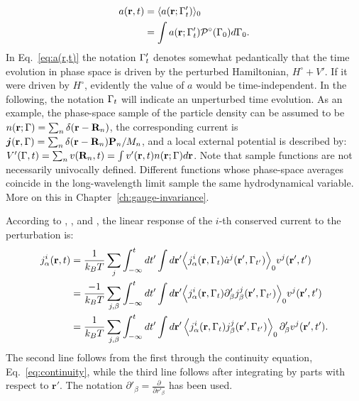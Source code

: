 \begin{equation}
  \begin{aligned}
    a(\mathbf{r},t) &= \langle a(\mathbf{r};\rGamma'_t)\rangle_0 \\
    &= \int a(\mathbf{r};\rGamma'_t) \mathcal{P}^\circ(\rGamma_0) d\rGamma_0.
  \end{aligned} \label{eq:a(r,t)}
\end{equation}
In Eq.~\eqref{eq:a(r,t)} the notation ${\mathrm\Gamma}'_t$ denotes somewhat pedantically that the time evolution in phase space is driven by the perturbed Hamiltonian, $H^\circ+V'$. If it were driven by $H^\circ$, evidently the value of $a$ would be time-independent. In the following, the notation ${\mathrm\Gamma}_t$ will indicate an unperturbed time evolution. As an example, the phase-space sample of the particle density can be assumed to be $n(\mathbf{r};{\mathrm\Gamma}) = \sum_n \delta (\mathbf{r}-\mathbf{R}_n)$, the corresponding current is $\bm{j} (\mathbf{r}, {\mathrm\Gamma}) = \sum_n \delta(\mathbf{r}-\mathbf{R}_n) \mathbf{P}_n / M_n $, and a local external potential is described by: $V'({\mathrm\Gamma},t)=\sum_n v(\mathbf{R}_n,t)=\int v'(\mathbf{r},t) n(\mathbf{r};{\mathrm\Gamma}) d \mathbf{r}$. Note that sample functions are not necessarily univocally defined. Different functions whose phase-space averages coincide in the long-wavelength limit sample the same hydrodynamical variable. More on this in Chapter~\ref{ch:gauge-invariance}.

According to \cite{Green1954}, \cite{Kubo1957a}, and \cite{Kubo1957b}, the linear response of the $i$-th conserved current to the perturbation is:
\begin{align}
  j_\alpha^i(\mathbf{r},t) & = \frac{1}{k_B T} \sum_j \int_{-\infty}^t dt' \int d\mathbf{r}' \Bigl \langle j_\alpha^i(\mathbf{r},\rGamma_t)\dot a^j(\mathbf{r}',\rGamma_{t'})\Bigr \rangle_0 v^j(\mathbf{r}',t') \\
  &= \frac{-1}{k_B T} \sum_{j,\beta} \int_{-\infty}^t dt' \int d\mathbf{r}' \Bigl \langle j_\alpha^i(\mathbf{r},\rGamma_t) \partial'_\beta j_\beta^j(\mathbf{r}',\rGamma_{t'})\Bigr \rangle_0 v^j(\mathbf{r}',t') \\
  &= \frac{1}{k_B T} \sum_{j,\beta} \int_{-\infty}^t dt' \int d\mathbf{r}' \left \langle j_\alpha^i(\mathbf{r},\rGamma_{t}) j_\beta^j(\mathbf{r}',\rGamma_{t'})\right \rangle_0 \partial'_\beta v^j(\mathbf{r}',t'). \label{eq:linear-response-c}
\end{align}
The second line follows from the first through the continuity equation, Eq.~\eqref{eq:continuity}, while the third line follows after integrating by parts with respect to $\mathbf{r}'$. The notation $\partial'_\beta=\frac{\partial}{\partial r'_\beta}$ has been used.

